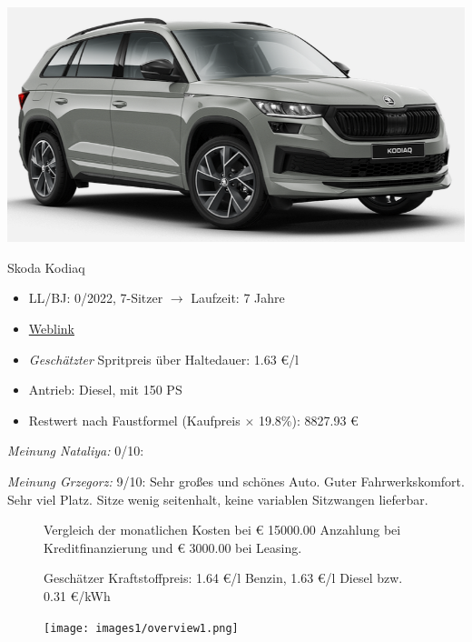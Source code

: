 \documentclass[landscape, DIV=99, 14pt]{scrartcl}
\begin{document}
\pagebreak
\begin{center}
\includegraphics[width=0.9\columnwidth]{cars/skoda-kodiaq-neu.png}

Skoda Kodiaq
\end{center}

\begin{itemize}
    \item LL/BJ: 0/2022, 7-Sitzer $\rightarrow$ Laufzeit: 7 Jahre
    \item \href{https://cc.skoda-auto.com/deu/de-DE/summary-scenic?activePage=summary&color=M3M3&configurationId=C7JJQ31L&extraEquipments=GPB3PB3%7CGPHBPHB%7CGPXGPXG%7CGPZBPZB%7CGWD1WD1%7CGYOZYOZ%7CMEPH7X2%7CGPWFPWF&id=DEU%3Bskoda%3B2022%3BNS7R3D%3B1%3BGYO2YO2%3Bmda20220204020232%3Bde-DE%3B%3B62004%3B62184&interior=HG&modifiedPages=trimlines%7Ccolors%7Cengines%7Cextraequipments&snapshotVersion=7da1da0b-dc09-4983-955f-ad97327f6f35&trimline=NSR%7CSportline6218462004&visitedPages=trimlines%7Ccolors%7Cwheels%7Cinteriors%7Cengines%7Cextraequipments%7Cservices}{Weblink}
    \item \emph{Gesch\"atzter} Spritpreis \"uber Haltedauer: 1.63 \euro{}/l
    \item Antrieb: Diesel, mit 150 PS
    \item Restwert nach Faustformel (Kaufpreis $\times$ 19.8\%): 8827.93 \euro{}
\end{itemize}

\begin{small}
\emph{Meinung Nataliya:} 0/10: 
        
\emph{Meinung Grzegorz:} 9/10: Sehr großes und schönes Auto. Guter Fahrwerkskomfort. Sehr viel Platz. Sitze wenig seitenhalt, keine variablen Sitzwangen lieferbar.
\end{small}

\pagebreak



\pagebreak

\onecolumn
\begin{figure}
\centering
Vergleich der monatlichen Kosten bei \euro{} 15000.00 Anzahlung bei Kreditfinanzierung und \euro{} 3000.00 bei Leasing.

Gesch\"atzer Kraftstoffpreis: 1.64 \euro{}/l Benzin, 1.63 \euro{}/l Diesel bzw. 0.31 \euro{}/kWh


\vspace{1em}
\texttt{[image: images1/overview1.png]}
\end{figure}
\vfill 
\end{document}
